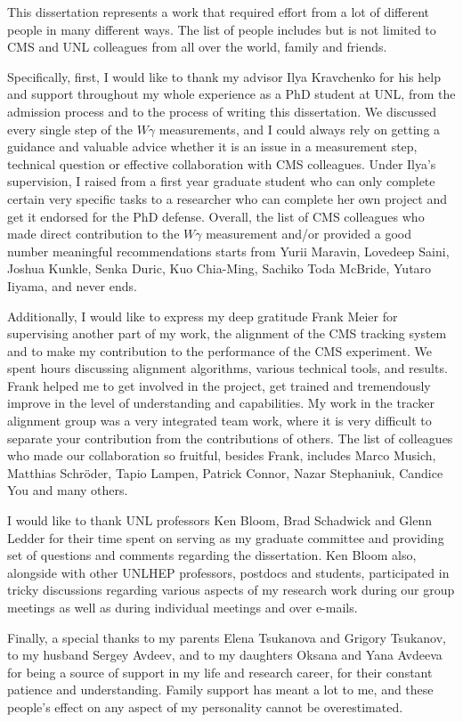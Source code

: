 \begin{acknowledgments}

This dissertation represents a work that required effort from a lot of different people in many different ways. The list of people includes but is not limited to CMS and UNL colleagues from all over the world, family and friends.

Specifically, first, I would like to thank my advisor Ilya Kravchenko for his help and support throughout my whole experience as a PhD student at UNL, from the admission process and to the process of writing this dissertation. We discussed every single step of the $W\gamma$ measurements, and I could always rely on getting a guidance and valuable advice whether it is an issue in a measurement step, technical question or effective collaboration with CMS colleagues. Under Ilya's supervision, I raised from a first year graduate student who can only complete certain very specific tasks to a researcher who can complete her own project and get it endorsed for the PhD defense. Overall, the list of CMS colleagues who made direct contribution to the $W\gamma$ measurement and/or provided a good number meaningful recommendations starts from Yurii Maravin, Lovedeep Saini, Joshua Kunkle, Senka Duric, Kuo Chia-Ming, Sachiko Toda McBride, Yutaro Iiyama, and never ends.   

Additionally,  I would like to express my deep gratitude Frank Meier for supervising another part of my work, the alignment of the CMS tracking system and to make my contribution to the performance of the CMS experiment. We spent hours discussing alignment algorithms, various technical tools, and results. Frank helped me to get involved in the project, get trained and tremendously improve in the level of understanding and capabilities. My work in the tracker alignment group was a very integrated team work, where it is very difficult to separate your contribution from the contributions of others. The list of colleagues who made our collaboration so fruitful, besides Frank, includes Marco Musich, Matthias Schr\"{o}der, Tapio Lampen, Patrick Connor, Nazar Stephaniuk, Candice You and many others. 

I would like to thank UNL professors Ken Bloom, Brad Schadwick and Glenn Ledder for their time spent on serving as my graduate committee and providing set of questions and comments regarding the dissertation. Ken Bloom also, alongside with other UNLHEP professors, postdocs and students, participated in tricky discussions regarding various aspects of my research work during our group meetings as well as during individual meetings and over e-mails. 

Finally, a special thanks to my parents Elena Tsukanova and Grigory Tsukanov, to my husband Sergey Avdeev, and to my daughters Oksana and Yana Avdeeva for being a source of support in my life and research career, for their constant patience and understanding. Family support has meant a lot to me, and these people's effect on any aspect of my personality cannot be overestimated.



\end{acknowledgments}
